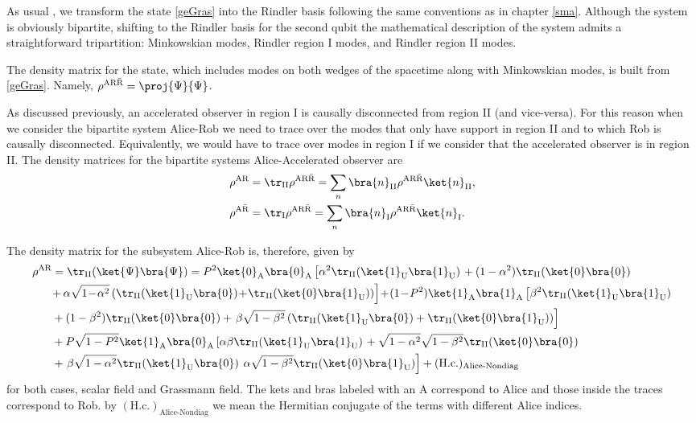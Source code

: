 As usual \cite{Alicefalls,AlsingSchul}, we transform the state \eqref{geGras} into the Rindler basis following the same conventions as in chapter \ref{sma}. Although the system is obviously bipartite, shifting to the Rindler basis for the second qubit the mathematical description of the system admits a straightforward tripartition: Minkowskian modes, Rindler region I modes, and Rindler region II  modes. 

The density matrix for the state, which includes modes on both wedges of the spacetime along with Minkowskian modes, is built from \eqref{geGras}. Namely, $\rho^{\text{AR}\bar{\text{R}}}=\proj{\Psi}{\Psi}$.

As discussed previously, an accelerated observer in region I is causally disconnected from region II (and vice-versa). For this reason when we consider the bipartite system Alice-Rob we need to trace over the modes that only have support in region II and to which Rob is causally disconnected. Equivalently, we would have to trace over modes in region I if we consider that the accelerated observer is in region II. The density matrices for the bipartite systems Alice-Accelerated observer are 
\begin{align}
\label{AR2}\rho^{\text{AR}}&=\tr_{\text{II}}\rho^{\text{AR}\bar{\text{R}}}=\sum_{n} \bra{n}_{\text{II}}\rho^{\text{AR}\bar{\text{R}}}\ket{n}_{\text{II}},\\*
\label{AAR2}\rho^{\text{A}\bar{\text{R}}}&=\tr_{\text{I}}\rho^{\text{AR}\bar{\text{R}}}=\sum_{n} \bra{n}_{\text{I}}\rho^{\text{AR}\bar{\text{R}}}\ket{n}_{\text{I}}.
\end{align}

The density matrix for the subsystem Alice-Rob is, therefore, given by
\begin{align}\label{rhog}\rho^{\text{A}{\text{R}}}&=\tr_\text{II}(\ket{\Psi}\bra{\Psi})=P^2\ket{0}_\text{A}\bra{0}_\text{A}\left[\alpha^2\tr_\text{II}(\ket{1}_\text{U}\bra{1}_\text{U})\right.+(1-\alpha^2)\tr_\text{II}(\ket{0}\bra{0})\nonumber\\&\!+\!\left.\alpha\sqrt{1\!-\!\alpha^2}\left(\tr_\text{II}(\ket{1}_\text{U}\bra{0})\!+\!\tr_\text{II}(\ket{0}\bra{1}_\text{U})\right)\right]\!+\!(1\!-\!P^2)\ket{1}_\text{A}\bra{1}_\text{A}\left[\beta^2\tr_\text{II}(\ket{1}_\text{U}\bra{1}_\text{U})\right.\nonumber\\&+(1-\beta^2)\tr_\text{II}(\ket{0}\bra{0})+\left.\beta\sqrt{1-\beta^2}\left(\tr_\text{II}(\ket{1}_\text{U}\bra{0})+\tr_\text{II}(\ket{0}\bra{1}_\text{U})\right)\right]\nonumber\\&+P\sqrt{1-P^2}\ket{1}_\text{A}\bra{0}_\text{A}\left[\alpha\beta\tr_\text{II}(\ket{1}_\text{U}\bra{1}_\text{U})\right.+\sqrt{1-\alpha^2}\sqrt{1-\beta^2}\tr_\text{II}(\ket{0}\bra{0})\nonumber\\&+\left.\beta\sqrt{1-\alpha^2}\tr_\text{II}(\ket{1}_\text{U}\bra{0})\right.\left.\alpha\sqrt{1-\beta^2}\tr_\text{II}(\ket{0}\bra{1}_\text{U})\right]+(\text{H.c.})_\text{Alice-Nondiag}\end{align}
for both cases, scalar field and Grassmann field. The kets and bras labeled with an A correspond to Alice and those inside the traces correspond to Rob.  by $(\text{H.c.})_\text{Alice-Nondiag}$ we mean the Hermitian conjugate of the terms with different Alice indices. 

